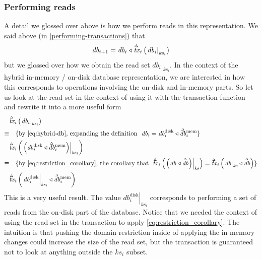 \documentclass[11pt,a4paper]{article}
\newcommand\restrict[2]{\left.#1\right|_{#2}}
\newcommand\deltavar[1]{\accentset{\Delta}{#1}}
\begin{document}
\subsubsection{Performing reads}

A detail we glossed over above is how we perform reads in this
representation. We said above (in \cref{performing-transactions}) that
\[
\mathit{db}_{i+1} = \mathit{db}_i \triangleleft \deltavar{\mathit{tx}}_i\left(\restrict{\mathit{db}_i}{\mathit{ks}_i}\right)
\]
but we glossed over how we obtain the read set
$\restrict{\mathit{db}_i}{\mathit{ks}_i}$. In the context of the hybrid
in-memory / on-disk database representation, we are interested in how this
corresponds to operations involving the on-disk and in-memory parts. So let us
look at the read set in the context of using it with the transaction function
and rewrite it into a more useful form
\begin{align*}
       & \deltavar{\mathit{tx}}_i\left(\restrict{\mathit{db}_i}{\mathit{ks}_i}\right)
\\
\equiv & \quad \text{\{by \cref{eq:hybrid-db}, expanding the definition ~$\mathit{db}_i = \mathit{db}^{\mathrm{disk}}_i \triangleleft \deltavar{\mathit{db}}^{\mathrm{mem}}_i$\}}
\\
       & \deltavar{\mathit{tx}}_i\left(\restrict{\left(\mathit{db}^{\mathrm{disk}}_i \triangleleft \deltavar{\mathit{db}}^{\mathrm{mem}}_i\right)}{\mathit{ks}_i}\right)
\\
\equiv & \quad \text{\{by \cref{eq:restriction_corollary}, the corollary that ~$\deltavar{\mathit{tx}}_i\left(\restrict{\left(\mathit{db} \triangleleft \deltavar{\mathit{db}}\right)}{\mathit{ks}}\right)
=
  \deltavar{\mathit{tx}}_i\left(\restrict{\mathit{db}}{\mathit{ks}} \triangleleft \deltavar{\mathit{db}}\right)$\}}
\\
       & \deltavar{\mathit{tx}}_i\left(\restrict{\mathit{db}^{\mathrm{disk}}_i}{\mathit{ks}_i} \triangleleft \deltavar{\mathit{db}}^{\mathrm{mem}}_i\right)
\end{align*}
This is a very useful result. The value $\restrict{\mathit{db}^{\mathrm{disk}}_i}{\mathit{ks}_i}$
corresponds to performing a set of reads from the on-disk part of the database.
Notice that we needed the context of using the read set in the transaction to
apply \cref{eq:restriction_corollary}. The intuition is that pushing the
domain restriction inside of applying the in-memory changes could increase the
size of the read set, but the transaction is guaranteed not to look at anything
outside the $\mathit{ks}_i$ subset.
\end{document}
